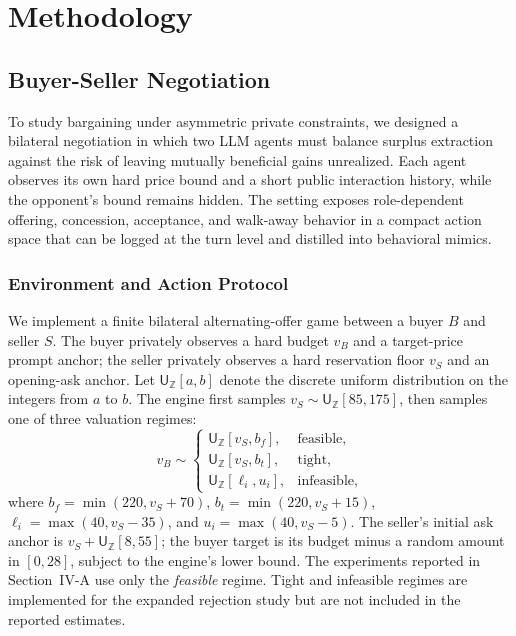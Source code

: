 \documentclass[conference]{IEEEtran}
\begin{document}
\section{Methodology}

\subsection{Buyer-Seller Negotiation}

To study bargaining under asymmetric private constraints, we designed a bilateral negotiation in which two LLM agents must balance surplus extraction against the risk of leaving mutually beneficial gains unrealized. Each agent observes its own hard price bound and a short public interaction history, while the opponent's bound remains hidden. The setting exposes role-dependent offering, concession, acceptance, and walk-away behavior in a compact action space that can be logged at the turn level and distilled into behavioral mimics.

\subsubsection{Environment and Action Protocol}

We implement a finite bilateral alternating-offer game between a buyer $B$ and seller $S$. The buyer privately observes a hard budget $v_B$ and a target-price prompt anchor; the seller privately observes a hard reservation floor $v_S$ and an opening-ask anchor. Let $\mathsf{U}_{\mathbb{Z}}[a,b]$ denote the discrete uniform distribution on the integers from $a$ to $b$. The engine first samples $v_S\sim\mathsf{U}_{\mathbb{Z}}[85,175]$, then samples one of three valuation regimes:
\begin{equation}
v_B\sim
\begin{cases}
\mathsf{U}_{\mathbb{Z}}[v_S,b_f], & \text{feasible},\\
\mathsf{U}_{\mathbb{Z}}[v_S,b_t], & \text{tight},\\
\mathsf{U}_{\mathbb{Z}}[\ell_i,u_i], & \text{infeasible},
\end{cases}
\end{equation}
where $b_f=\min(220,v_S+70)$, $b_t=\min(220,v_S+15)$, $\ell_i=\max(40,v_S-35)$, and $u_i=\max(40,v_S-5)$. The seller's initial ask anchor is $v_S+\mathsf{U}_{\mathbb{Z}}[8,55]$; the buyer target is its budget minus a random amount in $[0,28]$, subject to the engine's lower bound. The experiments reported in Section~IV-A use only the \emph{feasible} regime. Tight and infeasible regimes are implemented for the expanded rejection study but are not included in the reported estimates.
\end{document}
